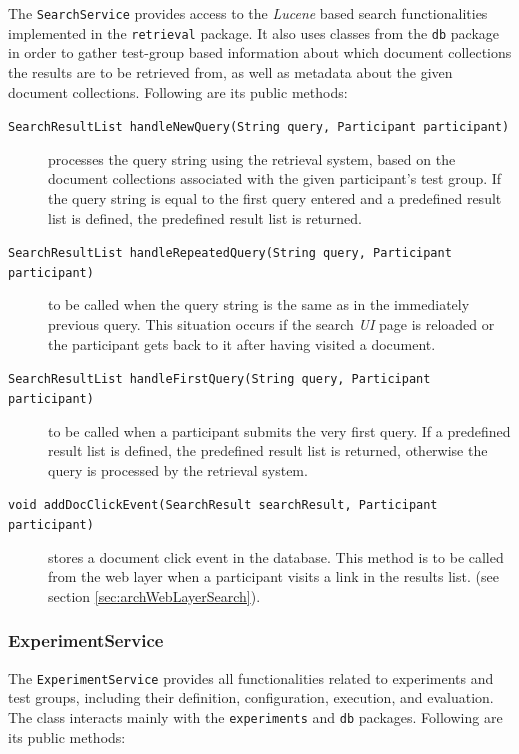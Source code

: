 \documentclass[a4paper]{usiinfbachelorproject}
\begin{document}
The \texttt{SearchService} provides access to the \emph{Lucene} based search functionalities implemented
in the \texttt{retrieval} package. It also uses classes from the \texttt{db} package in order to gather test-group based information
about which document collections the results are to be retrieved from, as well as metadata about the given document collections. 
Following are its public methods:

    \begin{description}

        \item[\texttt{SearchResultList handleNewQuery(String query, Participant participant)}]
            processes the query string using the retrieval system, based on the document collections associated with the given participant's test group. If
            the query string is equal to the first query entered and a predefined result list is defined, the predefined result list is returned.

        \item[\texttt{SearchResultList handleRepeatedQuery(String query, Participant participant)}] 
            to be called when the query string is the same as in the immediately previous query. This situation occurs if the
            search \emph{UI} page is reloaded or the participant gets back to it after having visited a document. 

        \item[\texttt{SearchResultList handleFirstQuery(String query, Participant participant)}]
            to be called when a participant submits the very first query. If a predefined result list is defined, the predefined result list is returned,
            otherwise the query is processed by the retrieval system.

        \item[\texttt{void addDocClickEvent(SearchResult searchResult, Participant participant)}]
            stores a document click event in the database. This method is to be called from the web layer when a participant visits
            a link in the results list. (see section \ref{sec:archWebLayerSearch}).

    \end{description}

\subsubsection{\textbf{ExperimentService}}

The \texttt{ExperimentService} provides all functionalities related to experiments and test groups, including their definition,
configuration, execution, and evaluation. The class interacts mainly with the \texttt{experiments} and \texttt{db}
packages. Following are its public methods:
\end{document}
